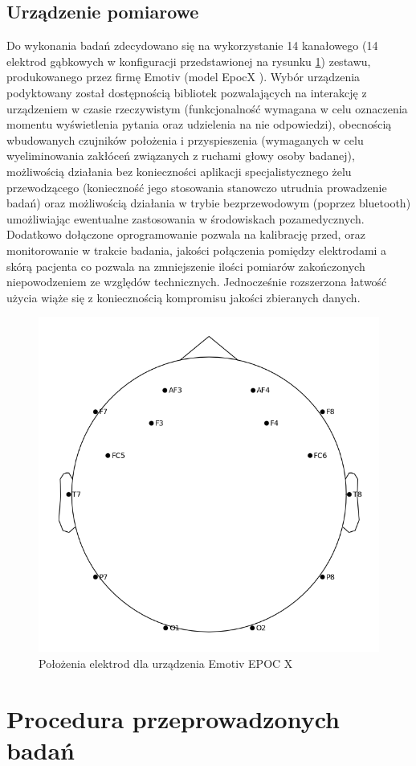 \documentclass{./assets/wfis}
\begin{document}
\subsection{Urządzenie pomiarowe}\label{emotiv}
Do wykonania badań zdecydowano się na wykorzystanie 14 kanałowego (14 elektrod gąbkowych w konfiguracji przedstawionej na rysunku \ref{fig:emotiv-electrode-locations}) zestawu, produkowanego przez firmę Emotiv (model EpocX \cite{emotiv_inc_epoc_nodate}). Wybór urządzenia podyktowany został dostępnością bibliotek pozwalających na interakcję z urządzeniem w czasie rzeczywistym \cite{emotiv_inc_emotiv_nodate-1} (funkcjonalność wymagana w celu oznaczenia momentu wyświetlenia pytania oraz udzielenia na nie odpowiedzi), obecnością wbudowanych czujników położenia i przyspieszenia (wymaganych w celu wyeliminowania zakłóceń związanych z ruchami głowy osoby badanej), możliwością działania bez konieczności aplikacji specjalistycznego żelu przewodzącego (konieczność jego stosowania stanowczo utrudnia prowadzenie badań) oraz możliwością działania w trybie bezprzewodowym (poprzez bluetooth) umożliwiając ewentualne zastosowania w środowiskach pozamedycznych. Dodatkowo dołączone oprogramowanie pozwala na kalibrację przed, oraz monitorowanie w trakcie badania, jakości połączenia pomiędzy elektrodami a skórą pacjenta co pozwala na zmniejszenie ilości pomiarów zakończonych niepowodzeniem ze względów technicznych. Jednocześnie rozszerzona łatwość użycia wiąże się z koniecznością kompromisu jakości zbieranych danych. 

\begin{figure}[h!]
    \centering
    \includegraphics[width=0.5\columnwidth]{thesis/emotiv_electrode_locations.png}
    \caption{Położenia elektrod dla urządzenia Emotiv EPOC X}
    \label{fig:emotiv-electrode-locations}
\end{figure}


\section{Procedura przeprowadzonych badań}\label{procedura-badan}
\end{document}
